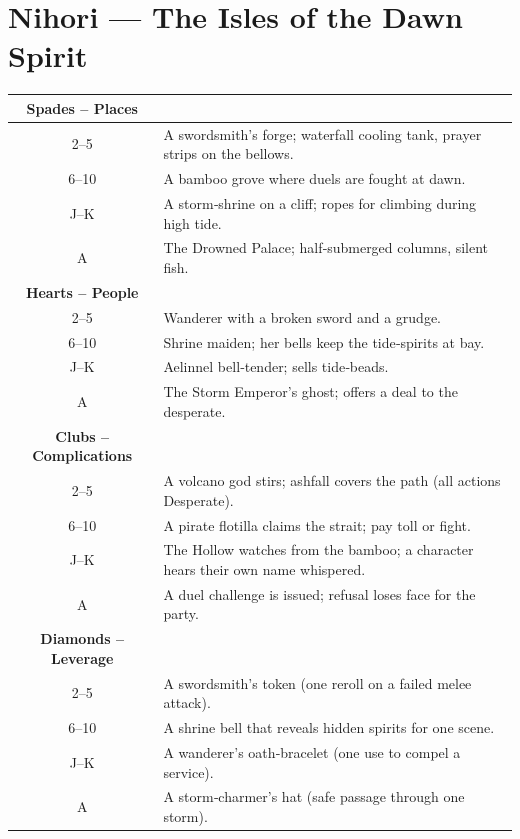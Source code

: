 \documentclass[12pt]{book}
\begin{document}
\section{Nihori --- The Isles of the Dawn Spirit}
\begin{longtable}{c X}
\toprule
\textbf{Spades -- Places} & \\
\midrule
2--5   & A swordsmith's forge; waterfall cooling tank, prayer strips on the bellows. \\
6--10 & A bamboo grove where duels are fought at dawn. \\
J--K  & A storm‑shrine on a cliff; ropes for climbing during high tide. \\
A    & The Drowned Palace; half‑submerged columns, silent fish. \\
\midrule
\textbf{Hearts -- People} & \\
\midrule
2--5   & Wanderer with a broken sword and a grudge. \\
6--10 & Shrine maiden; her bells keep the tide‑spirits at bay. \\
J--K  & Aelinnel bell‑tender; sells tide‑beads. \\
A    & The Storm Emperor's ghost; offers a deal to the desperate. \\
\midrule
\textbf{Clubs -- Complications} & \\
\midrule
2--5   & A volcano god stirs; ashfall covers the path (all actions Desperate). \\
6--10 & A pirate flotilla claims the strait; pay toll or fight. \\
J--K  & The Hollow watches from the bamboo; a character hears their own name whispered. \\
A    & A duel challenge is issued; refusal loses face for the party. \\
\midrule
\textbf{Diamonds -- Leverage} & \\
\midrule
2--5   & A swordsmith's token (one reroll on a failed melee attack). \\
6--10 & A shrine bell that reveals hidden spirits for one scene. \\
J--K  & A wanderer's oath‑bracelet (one use to compel a service). \\
A    & A storm‑charmer's hat (safe passage through one storm). \\
\bottomrule
\end{longtable}
\end{document}
